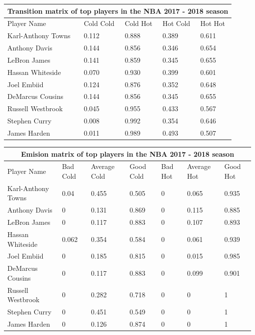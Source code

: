 \documentclass[12pt, authoryear]{elsarticle}
\begin{document}
\begin{tabular}{ |p{3cm}||p{2cm}|p{2cm}|p{2cm}|p{2cm}|  }
	\hline
	\multicolumn{5}{|c|}{Transition matrix of top players in the NBA 2017 - 2018 season} \\
	\hline
	Player Name & Cold Cold & Cold Hot &Hot Cold & Hot Hot\\
	\hline
	Karl-Anthony Towns&   0.112 &	0.888 &	0.389 &	0.611\\
	Anthony Davis&   0.144&	0.856&	0.346&	0.654\\
	LeBron James &0.141&	0.859&	0.345&	0.655\\
	Hassan Whiteside    &	0.070&	0.930&	0.399&	0.601\\
	Joel Embiid&   0.124&	0.876&	0.352&	0.648\\
	DeMarcus Cousins& 0.144&	0.856&	0.345&	0.655\\
	Russell Westbrook& 0.045&	0.955&	0.433&	0.567\\
	Stephen Curry& 0.008&	0.992&	0.354&	0.646\\
	James Harden&  0.011&	0.989&	0.493&	0.507\\
	\hline
\end{tabular}

\begin{tabular}{ |p{3cm}||p{1.5cm}|p{1.5cm}|p{1.5cm}|p{1.5cm}|p{1.5cm}|p{1.5cm}|  }
	\hline
	\multicolumn{7}{|c|}{Emision matrix of top players in the NBA 2017 - 2018 season} \\
	\hline
	Player Name &Bad Cold& Average Cold&	Good Cold&	Bad Hot&	Average Hot&	Good Hot\\
	\hline
	Karl-Anthony Towns&   0.04&	0.455&	0.505&	0&	0.065&	0.935\\
	Anthony Davis&   0&	0.131&	0.869&	0&	0.115&	0.885\\
	LeBron James &0&	0.117&	0.883&	0&	0.107&	0.893\\
	Hassan Whiteside    &0.062&	0.354&	0.584&	0&	0.061&	0.939\\
	Joel Embiid& 0& 0.185&	0.815&	0&	0.015&	0.985\\
	DeMarcus Cousins& 0&	0.117&	0.883&	0&	0.099&	0.901\\
	Russell Westbrook& 0&	0.282&	0.718&	0&	0&	1\\
	Stephen Curry& 0&	0.451&	0.549&	0&	0&	1\\
	James Harden&  0&	0.126&	0.874&	0&	0&	1\\
	\hline
\end{tabular}
\end{document}
